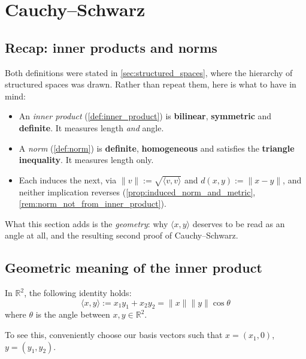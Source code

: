
\section{Cauchy--Schwarz}
\label{sec:cauchy_schwarz}

\subsection{Recap: inner products and norms}
\label{sec:inner_products_recap}

Both definitions were stated in \cref{sec:structured_spaces}, where the hierarchy of structured
spaces was drawn. Rather than repeat them, here is what to have in mind:
\begin{itemize}
  \item An \emph{inner product} (\cref{def:inner_product}) is \textbf{bilinear},
    \textbf{symmetric} and \textbf{definite}. It measures length \emph{and} angle.
  \item A \emph{norm} (\cref{def:norm}) is \textbf{definite}, \textbf{homogeneous} and
    satisfies the \textbf{triangle inequality}. It measures length only.
  \item Each induces the next, via $\|v\| := \sqrt{\langle v,v\rangle}$ and
    $d(x,y) := \|x-y\|$, and neither implication reverses
    (\cref{prop:induced_norm_and_metric}, \cref{rem:norm_not_from_inner_product}).
\end{itemize}
What this section adds is the \emph{geometry}: why $\langle x,y\rangle$ deserves to be read as an
angle at all, and the resulting second proof of Cauchy--Schwarz.

\subsection{Geometric meaning of the inner product}

In $\mathbb{R}^2$, the following identity holds:
\[
\langle x,y\rangle := x_1y_1 + x_2y_2 = \|x\|\|y\|\cos\theta
\]
where $\theta$ is the angle between $x, y \in \mathbb{R}^2$.

To see this, conveniently choose our basis vectors such that $x = (x_1, 0)$, $y = (y_1, y_2)$.

